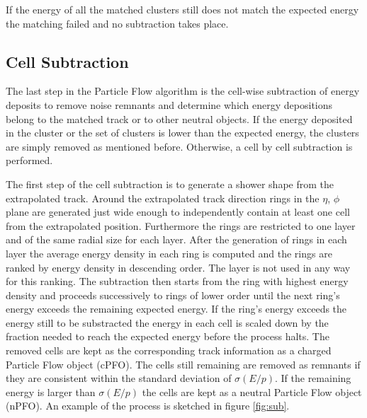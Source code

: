 If the energy of all the matched clusters still does not match the expected energy the matching failed and no subtraction takes place.

\subsection{Cell Subtraction}

The last step in the Particle Flow algorithm is the cell-wise subtraction of energy deposits to remove noise remnants and determine which energy depositions belong to the matched track or to other neutral objects.
If the energy deposited in the cluster or the set of clusters is lower than the expected energy, the clusters are simply removed as mentioned before. Otherwise, a cell by cell subtraction is performed.

The first step of the cell subtraction is to generate a shower shape from the extrapolated track. Around the extrapolated track direction rings in the $\eta$, $\phi$ plane are generated just wide enough to independently contain at least one cell from the extrapolated position. Furthermore the rings are restricted to one layer and of the same radial size for each layer.
After the generation of rings in each layer the average energy density in each ring is computed and the rings are ranked by energy density in descending order. The layer is not used in any way for this ranking.
The subtraction then starts from the ring with highest energy density and proceeds successively to rings of lower order until the next ring's energy exceeds the remaining expected energy.
If the ring's energy exceeds the energy still to be substracted the energy in each cell is scaled down by the fraction needed to reach the expected energy before the process halts. The removed cells are kept as the corresponding track information as a charged Particle Flow object (cPFO). The cells still remaining are removed as remnants if they are consistent within the standard deviation of $\sigma (E/p)$. If the remaining energy is larger than $\sigma (E/p)$ the cells are kept as a neutral Particle Flow object (nPFO).
An example of the process is sketched in figure \ref{fig:sub}. 




